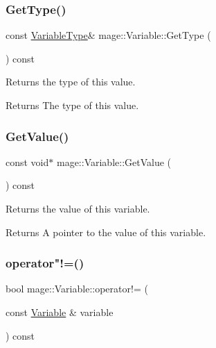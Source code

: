 \subsubsection{\texorpdfstring{Get\+Type()}{GetType()}}
{\footnotesize\ttfamily const \hyperlink{namespacemage_a530428e73bac0ba7fe84b29086a9e33a}{Variable\+Type}\& mage\+::\+Variable\+::\+Get\+Type (\begin{DoxyParamCaption}{ }\end{DoxyParamCaption}) const}

Returns the type of this value.

\begin{DoxyReturn}{Returns}
The type of this value. 
\end{DoxyReturn}
\hypertarget{structmage_1_1_variable_a65ecc95bcdc26733394d3a32d3d698f1}{}\label{structmage_1_1_variable_a65ecc95bcdc26733394d3a32d3d698f1} 
\subsubsection{\texorpdfstring{Get\+Value()}{GetValue()}}
{\footnotesize\ttfamily const void$\ast$ mage\+::\+Variable\+::\+Get\+Value (\begin{DoxyParamCaption}{ }\end{DoxyParamCaption}) const}

Returns the value of this variable.

\begin{DoxyReturn}{Returns}
A pointer to the value of this variable. 
\end{DoxyReturn}
\hypertarget{structmage_1_1_variable_a7983cd74a25e3998abac8d89245d1fd9}{}\label{structmage_1_1_variable_a7983cd74a25e3998abac8d89245d1fd9} 
\subsubsection{\texorpdfstring{operator"!=()}{operator!=()}}
{\footnotesize\ttfamily bool mage\+::\+Variable\+::operator!= (\begin{DoxyParamCaption}\item[{const \hyperlink{structmage_1_1_variable}{Variable} \&}]{variable }\end{DoxyParamCaption}) const}

